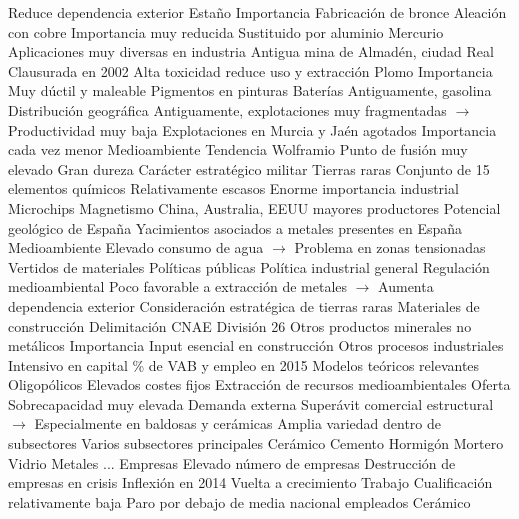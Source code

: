 \documentclass{nuevotema}
\begin{document}
\begin{esquemal}
				\4[] Reduce dependencia exterior
			\3 Estaño
				\4 Importancia
				\4[] Fabricación de bronce
				\4[] Aleación con cobre
				\4[] Importancia muy reducida
				\4[] Sustituido por aluminio
			\3 Mercurio
				\4 Aplicaciones muy diversas en industria
				\4 Antigua mina de Almadén, ciudad Real
				\4[] Clausurada en 2002
				\4 Alta toxicidad reduce uso y extracción
			\3 Plomo
				\4 Importancia
				\4[] Muy dúctil y maleable
				\4[] Pigmentos en pinturas
				\4[] Baterías
				\4[] Antiguamente, gasolina
				\4 Distribución geográfica
				\4[] Antiguamente, explotaciones muy fragmentadas
				\4[] $\to$ Productividad muy baja
				\4[] Explotaciones en Murcia y Jaén agotados
				\4[] Importancia cada vez menor
				\4 Medioambiente
				\4[] Tendencia
			\3 Wolframio
				\4 Punto de fusión muy elevado
				\4 Gran dureza
				\4 Carácter estratégico militar
			\3 Tierras raras
				\4 Conjunto de 15 elementos químicos
				\4 Relativamente escasos
				\4 Enorme importancia industrial
				\4[] Microchips
				\4[] Magnetismo
				\4 China, Australia, EEUU mayores productores
				\4 Potencial geológico de España
				\4 Yacimientos asociados a metales presentes en España
				\4 Medioambiente
				\4[] Elevado consumo de agua
				\4[] $\to$ Problema en zonas tensionadas
				\4[] Vertidos de materiales
			\3 Políticas públicas
				\4 Política industrial general
				\4 Regulación medioambiental
				\4[] Poco favorable a extracción de metales
				\4[] $\to$ Aumenta dependencia exterior
				\4 Consideración estratégica de tierras raras
		\2 Materiales de construcción
			\3 Delimitación
				\4 CNAE División 26 Otros productos minerales no metálicos
				\4 Importancia
				\4[] Input esencial en construcción
				\4[] Otros procesos industriales
				\4[] Intensivo en capital
				\% de VAB y empleo en 2015
				\4 Modelos teóricos relevantes
				\4[] Oligopólicos
				\4[] Elevados costes fijos
				\4[] Extracción de recursos medioambientales
				\4 Oferta
				\4[] Sobrecapacidad muy elevada
				\4 Demanda externa
				\4[] Superávit comercial estructural
				\4[] $\to$ Especialmente en baldosas y cerámicas
				\4 Amplia variedad dentro de subsectores
				\4 Varios subsectores principales
				\4[] Cerámico
				\4[] Cemento
				\4[] Hormigón
				\4[] Mortero
				\4[] Vidrio
				\4[] Metales
				\4[] ...
			\3 Empresas
				\4 Elevado número de empresas
				\4 Destrucción de empresas en crisis
				\4 Inflexión en 2014
				\4[] Vuelta a crecimiento
			\3 Trabajo
				\4 Cualificación relativamente baja
				\4 Paro por debajo de media nacional
				 empleados
			\3 Cerámico

\end{esquemal}
\end{document}
